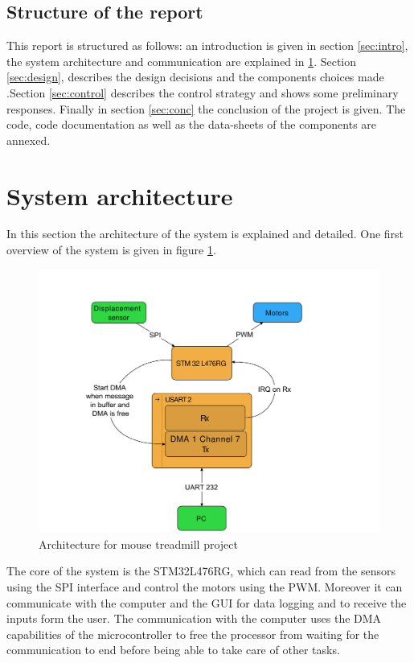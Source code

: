 \documentclass[12pt,a4paper, twoside]{article}
\begin{document}
\subsection{Structure of the report}
This report is structured as follows: an introduction is given in section \ref{sec:intro}, the system architecture and communication are explained in \ref{sec:archi}. Section \ref{sec:design}, describes the design decisions and the components choices made .Section \ref{sec:control} describes the control strategy and shows some preliminary responses.
Finally in section \ref{sec:conc} the conclusion of the project is given. The code, code documentation as well as the data-sheets of the components are annexed.

\section{System architecture} \label{sec:archi}
In this section the architecture of the system is explained and detailed.
One first overview of the system is given in figure \ref{fig:arch}.
\begin{figure}[H]
	\centering
	\includegraphics[width=0.9\linewidth]{fig/archi.pdf}
	\caption{Architecture for mouse treadmill project}
	\label{fig:arch}
\end{figure}
The core of the system is the STM32L476RG, which can read from the sensors using the SPI interface and control the motors using the PWM. Moreover it can communicate with the computer and the GUI for data logging and to receive the inputs form the user. The communication with the computer uses the DMA capabilities of the microcontroller to free the processor from waiting for the communication to end before being able to take care of other tasks.
\end{document}

